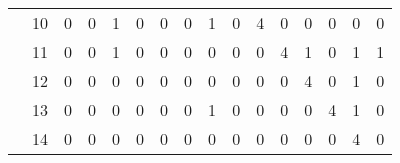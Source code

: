 \documentclass[12pt]{article}
\begin{document}
\begin{enumerate}
\begin{table}[H]
\begin{tabular}{@{}llclllllllllllll@{}}
\cellcolor[HTML]{34FF34}                                   & \cellcolor[HTML]{34FF34}10 & 0                         & 0                         & 1                         & 0                         & 0                         & 0                         & 1                         & 0                         & 4                          & 0                          & 0                          & 0                          & 0                          & 0                          \\
\cellcolor[HTML]{34FF34}                                   & \cellcolor[HTML]{34FF34}11 & 0                         & 0                         & 1                         & 0                         & 0                         & 0                         & 0                         & 0                         & 0                          & 4                          & 1                          & 0                          & 1                          & 1                          \\
\cellcolor[HTML]{34FF34}                                   & \cellcolor[HTML]{34FF34}12 & 0                         & 0                         & 0                         & 0                         & 0                         & 0                         & 0                         & 0                         & 0                          & 0                          & 4                          & 0                          & 1                          & 0                          \\
\cellcolor[HTML]{34FF34}                                   & \cellcolor[HTML]{34FF34}13 & 0                         & 0                         & 0                         & 0                         & 0                         & 0                         & 1                         & 0                         & 0                          & 0                          & 0                          & 4                          & 1                          & 0                          \\
\cellcolor[HTML]{34FF34}                                   & \cellcolor[HTML]{34FF34}14 & 0                         & 0                         & 0                         & 0                         & 0                         & 0                         & 0                         & 0                         & 0                          & 0                          & 0                          & 0                          & 4                          & 0                          \\

\end{tabular}
\end{table}
\end{enumerate}
\end{document}
